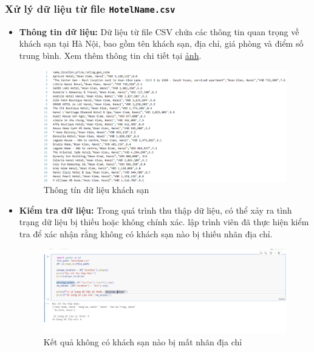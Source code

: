 \subsubsection{Xử lý dữ liệu từ file \texttt{HotelName.csv}}
\begin{itemize}
    \item \textbf{Thông tin dữ liệu:} Dữ liệu từ file CSV chứa các thông tin quan trọng về khách sạn tại Hà Nội, bao gồm tên khách sạn, địa chỉ, giá phòng và điểm số trung bình.  Xem thêm thông tin chi tiết tại \hyperlink{fig:iot123}{ảnh}. 
    \begin{figure} %
        \centering
        \includegraphics[width=1.0\linewidth]{Figures/2.1.1.png}
        \caption{Thông tín dữ liệu khách sạn}
        \label{fig:iot123}
    \end{figure}
    \item \textbf{Kiểm tra dữ liệu:} Trong quá trình thu thập dữ liệu, có thể xảy ra tình trạng dữ liệu bị thiếu hoặc không chính xác. lập trình viên đã thực hiện kiểm tra để xác nhận rằng không có khách sạn nào bị thiếu nhãn địa chỉ.
    \begin{figure}[H] %
        \centering
        \includegraphics[width=1.0\linewidth]{Figures/2.2.png}
        \caption{Kết quả không có khách sạn nào bị mất nhãn địa chỉ}
        \label{fig:iot}
    \end{figure}
    

\end{itemize}
